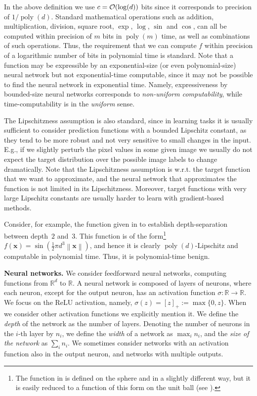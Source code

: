 \documentclass[11pt]{article}
\newcommand{\stam}[1]{}
\newcommand{\bx}{\mathbf{x}}
\newcommand{\co}{{\cal O}}
\newcommand{\reals}{{\mathbb R}}
\DeclareMathOperator{\poly}{poly}
\newcommand{\norm}[1]{\left\|#1\right\|}
\begin{document}
In the above definition we use $c=\co(\log(d))$ bits since it corresponds to precision of $1/{\poly(d)}$.
Standard mathematical operations such as addition, multiplication, division, square root, $\exp$, $\log$, $\sin$ and $\cos$, can all be computed within precision of $m$ bits in $\poly(m)$ time, as well as combinations of such operations. 
\stam{
	Thus, the requirement that we can compute $f$ within precision of a logarithmic number of bits in exponential time is very mild. Moreover, even a requirement that such computation can be done in polynomial time is mild.
}%
Thus, the requirement that we can compute $f$ within precision of a logarithmic number of bits in polynomial time is standard.
Note that 
a function may be expressible by an exponential-size (or even polynomial-size) neural network but not exponential-time computable, since it may not be possible to find the neural network in exponential time.
Namely, expressiveness by bounded-size neural networks corresponds to \emph{non-uniform computability}, while time-computability is in the \emph{uniform} sense.

The Lipschitzness assumption is also standard, since in learning tasks it is usually sufficient to consider prediction functions with a bounded Lipschitz constant, as they tend to be more robust and not very sensitive to small changes in the input. E.g., if we slightly perturb the pixel values in some given image we usually do not expect the target distribution over the possible image labels to change dramatically. Note that the Lipschitzness assumption is w.r.t. the target function that we want to approximate, and the neural network that approximates the function is not limited in its Lipschitzness.
Moreover, target functions with very large Lipschitz constants are usually harder to learn with gradient-based methods.

Consider, for example, the function given in \cite{daniely2017depth} to establish depth-separation between depth~$2$ and~$3$. This function is of the form\footnote{The function in \cite{daniely2017depth} is defined on the sphere and in a slightly different way, but it is easily reduced to a function of this form on the unit ball (see \cite{vardi2020neural,safran2019depth}).} $f(\bx)=\sin(\frac{1}{2} \pi d^3 \norm{\bx})$, and hence it is clearly $\poly(d)$-Lipschitz and computable in polynomial time. Thus, it is polynomial-time benign.


\textbf{Neural networks.}
We consider feedforward neural	networks, computing functions from $\reals^d$ to $\reals$. 
A neural network is composed of layers of neurons, where each neuron, except for the output neuron, has an activation function $\sigma:\reals \rightarrow \reals$.
We focus on the ReLU activation, namely, $\sigma(z) = [z]_+ := \max\{0,z\}$. When we consider other activation functions we explicitly mention it. 
We define the \emph{depth} of the network as the number of layers. Denoting the number of neurons in the $i$-th layer by $n_i$, we define the {\em width} of a network as $\max_{i}n_i$, and the {\em size of the network} as $\sum_{i}n_i$. 
We sometimes consider networks with an activation function also in the output neuron, and networks with multiple outputs.
\end{document}
